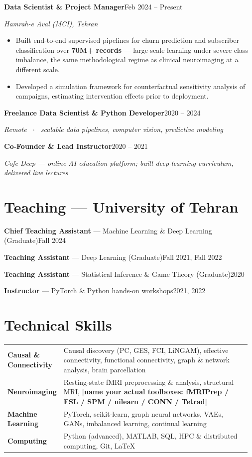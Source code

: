 \documentclass[10pt,a4paper]{article}
\newif\ifdraft
\newcommand{\fillme}[1]{%
  \ifdraft{\color{todo}\bfseries[FILL: #1]}\else\textbf{[#1]}\fi}
\newcommand{\role}[3]{%
  \par\vspace{4pt}%
  \textbf{#1}\hfill{\color{muted}\small #3}\par
  \textit{\color{muted}\small #2}\par\vspace{1.5pt}}
\newcommand{\teachline}[2]{%
  \par #1\hfill{\color{muted}\small #2}\par\vspace{2pt}}
\begin{document}
\role{Data Scientist \& Project Manager}{Hamrah-e Aval (MCI), Tehran}{Feb 2024 -- Present}
\begin{itemize}
  \item Built end-to-end supervised pipelines for churn prediction and subscriber classification
        over \textbf{70M+ records} --- large-scale learning under severe class imbalance, the same
        methodological regime as clinical neuroimaging at a different scale.
  \item Developed a simulation framework for counterfactual sensitivity analysis of campaigns,
        estimating intervention effects prior to deployment.
\end{itemize}

\role{Freelance Data Scientist \& Python Developer}{Remote \ $\cdot$ \ scalable data pipelines, computer vision, predictive modeling}{2020 -- 2024}
\role{Co-Founder \& Lead Instructor}{Cofe Deep --- online AI education platform; built deep-learning curriculum, delivered live lectures}{2020 -- 2021}

\section{Teaching --- University of Tehran}

\teachline{\textbf{Chief Teaching Assistant} --- Machine Learning \& Deep Learning (Graduate)}{Fall 2024}
\teachline{\textbf{Teaching Assistant} --- Deep Learning (Graduate)}{Fall 2021, Fall 2022}
\teachline{\textbf{Teaching Assistant} --- Statistical Inference \& Game Theory (Graduate)}{2020}
\teachline{\textbf{Instructor} --- PyTorch \& Python hands-on workshops}{2021, 2022}

\section{Technical Skills}

\begin{tabular}{@{}>{\bfseries}p{0.20\linewidth}p{0.77\linewidth}@{}}
Causal \& \newline Connectivity &
  Causal discovery (PC, GES, FCI, LiNGAM), effective connectivity, functional connectivity,
  graph \& network analysis, brain parcellation \\[3pt]
Neuroimaging &
  Resting-state fMRI preprocessing \& analysis, structural MRI,
  \fillme{name your actual toolboxes: fMRIPrep / FSL / SPM / nilearn / CONN / Tetrad} \\[3pt]
Machine Learning &
  PyTorch, scikit-learn, graph neural networks, VAEs, GANs, imbalanced learning, continual learning \\[3pt]
Computing &
  Python (advanced), MATLAB, SQL, HPC \& distributed computing, Git, \LaTeX{} \\
\end{tabular}
\end{document}
